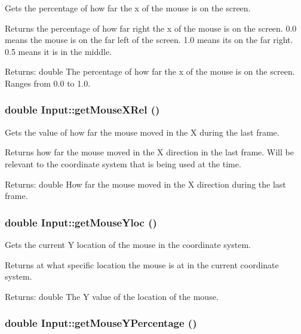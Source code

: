 Gets the percentage of how far the x of the mouse is on the screen. 

Returns the percentage of how far right the x of the mouse is on the screen. 0.0 means the mouse is on the far left of the screen. 1.0 means its on the far right. 0.5 means it is in the middle. \begin{Desc}
\item[Returns:]double The percentage of how far the x of the mouse is on the screen. Ranges from 0.0 to 1.0. \end{Desc}
\hypertarget{class_input_36213ede97566bcbcc06d709672b5eb7}{
\subsubsection[{getMouseXRel}]{\setlength{\rightskip}{0pt plus 5cm}double Input::getMouseXRel ()}}
\label{class_input_36213ede97566bcbcc06d709672b5eb7}


Gets the value of how far the mouse moved in the X during the last frame. 

Returns how far the mouse moved in the X direction in the last frame. Will be relevant to the coordinate system that is being used at the time. \begin{Desc}
\item[Returns:]double How far the mouse moved in the X direction during the last frame. \end{Desc}
\hypertarget{class_input_a5d8de5541d02dfc81ead5710ed3bded}{
\subsubsection[{getMouseYloc}]{\setlength{\rightskip}{0pt plus 5cm}double Input::getMouseYloc ()}}
\label{class_input_a5d8de5541d02dfc81ead5710ed3bded}


Gets the current Y location of the mouse in the coordinate system. 

Returns at what specific location the mouse is at in the current coordinate system. \begin{Desc}
\item[Returns:]double The Y value of the location of the mouse. \end{Desc}
\hypertarget{class_input_518969c4750a7c64fabca9fbe4c3ba55}{
\subsubsection[{getMouseYPercentage}]{\setlength{\rightskip}{0pt plus 5cm}double Input::getMouseYPercentage ()}}
\label{class_input_518969c4750a7c64fabca9fbe4c3ba55}


